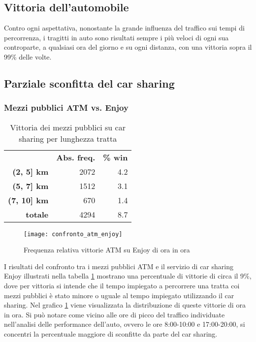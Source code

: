 \subsection{Vittoria dell'automobile}

Contro ogni aspettativa, nonostante la grande influenza del traffico sui tempi di percorrenza, i tragitti in auto sono risultati sempre i più veloci di ogni sua controparte, a qualsiasi ora del giorno e su ogni distanza, con una vittoria sopra il 99\% delle volte.

\subsection{Parziale sconfitta del car sharing}

\subsubsection{Mezzi pubblici ATM vs. Enjoy}

\begin{table}[H]
\centering
\begin{tabular}{ | r r r | }
\hline
& \textbf{Abs. freq.} & \textbf{\% win} \\
\textbf{(2, 5] km} & 2072 & 4.2 \\
\textbf{(5, 7] km} & 1512 & 3.1 \\
\textbf{(7, 10] km} & 670 & 1.4 \\
\hline
\textbf{totale} & 4294 & 8.7 \\
\hline
\end{tabular}
\caption{Vittoria dei mezzi pubblici su car sharing per lunghezza tratta}
\label{table:5}
\end{table}

\begin{figure}[H]
\texttt{[image: confronto\_atm\_enjoy]}
\caption{Frequenza relativa vittorie ATM su Enjoy di ora in ora}
\label{image:13}
\end{figure}

I risultati del confronto tra i mezzi pubblici ATM e il servizio di car sharing Enjoy illustrati nella tabella \ref{table:5} mostrano una percentuale di vittorie di circa il 9\%, dove per vittoria si intende che il tempo impiegato a percorrere una tratta coi mezzi pubblici è stato minore o uguale al tempo impiegato utilizzando il car sharing. Nel grafico \ref{image:13} viene visualizzata la distribuzione di queste vittorie di ora in ora. Si può notare come vicino alle ore di picco del traffico individuate nell'analisi delle performance dell'auto, ovvero le ore 8:00-10:00 e 17:00-20:00, si concentri la percentuale maggiore di sconfitte da parte del car sharing.

